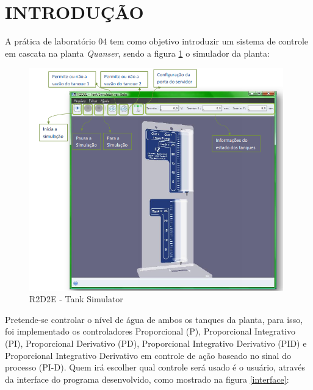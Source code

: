 \documentclass[a4paper,12pt]{article}
\begin{document}
\newpage


\thispagestyle{main}

\section{INTRODUÇÃO}

\hspace{4ex}A prática de laboratório 04 tem como objetivo introduzir um sistema de controle em cascata na planta \textit{Quanser}, sendo a figura \ref{r2d2e} o simulador da planta:

\begin{figure}[H]
\centering
\includegraphics[width=11cm]{ImagensLab4/simulator.png}
\caption{R2D2E - Tank Simulator}
\label{r2d2e}
\end{figure}

\hspace{4ex}Pretende-se controlar o nível de água de ambos os tanques da planta, para isso, foi implementado os controladores Proporcional (P), Proporcional Integrativo (PI), Proporcional Derivativo (PD), Proporcional Integrativo Derivativo (PID) e Proporcional Integrativo Derivativo em controle de ação baseado no sinal do processo (PI-D). Quem irá escolher qual controle será usado é o usuário, através da interface do programa desenvolvido, como mostrado na figura \ref{interface}:
\end{document}
